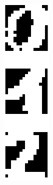 \documentclass[10pt,a4paper]{article}
\begin{document}
\begin{figure}[htb]
\centering
\begin{minipage}{0.08\textwidth}
\includegraphics[width=\textwidth]{figs/attractors.png}

\end{minipage}
\end{figure}
\end{document}
